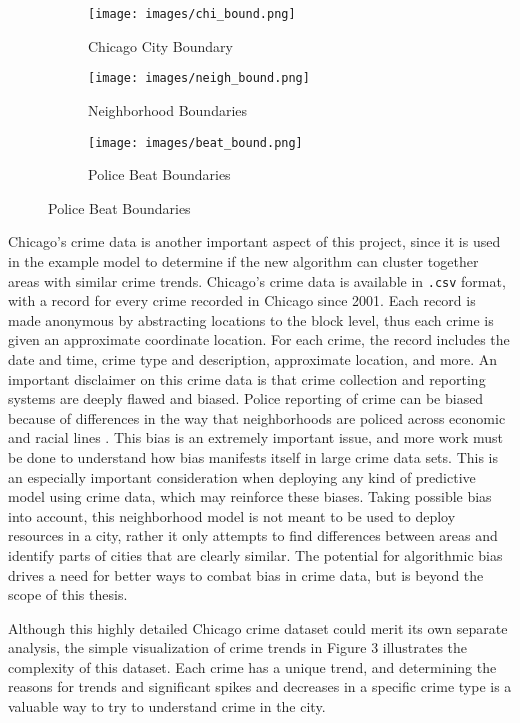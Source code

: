\documentclass[times new roman,12pt]{article}
\begin{document}
\begin{figure}[H]
\centering
\caption{Various Chicago Shapefile Boundaries}
\begin{subfigure}[t]{.33\textwidth}
\centering
  \texttt{[image: images/chi\_bound.png]}
  \caption{Chicago City Boundary}
  \label{fig:city_bound}
\end{subfigure}%
\begin{subfigure}[t]{.33\textwidth}
\centering
  \texttt{[image: images/neigh\_bound.png]}
  \caption{Neighborhood Boundaries}
  \label{fig:neigh_bound}
\end{subfigure}%
\begin{subfigure}[t]{.33\textwidth}
\centering
  \texttt{[image: images/beat\_bound.png]}
  \caption{Police Beat Boundaries}
  \label{fig:beat_bound}
\end{subfigure}
\label{fig:boundaries}
\end{figure}

Chicago's crime data is another important aspect of this project, since it is used in the example model to determine if the new algorithm can cluster together areas with similar crime trends. Chicago's crime data is available in \texttt{.csv} format, with a record for every crime recorded in Chicago since 2001. Each record is made anonymous by abstracting locations to the block level, thus each crime is given an approximate coordinate location. For each crime, the record includes the date and time, crime type and description, approximate location, and more. An important disclaimer on this crime data is that crime collection and reporting systems are deeply flawed and biased. Police reporting of crime can be biased because of differences in the way that neighborhoods are policed across economic and racial lines \cite{gaston_reasonable_2018}. This bias is an extremely important issue, and more work must be done to understand how bias manifests itself in large crime data sets. This is an especially important consideration when deploying any kind of predictive model using crime data, which may reinforce these biases. Taking possible bias into account, this neighborhood model is not meant to be used to deploy resources in a city, rather it only attempts to find differences between areas and identify parts of cities that are clearly similar. The potential for algorithmic bias drives a need for better ways to combat bias in crime data, but is beyond the scope of this thesis.

Although this highly detailed Chicago crime dataset could merit its own separate analysis, the simple visualization of crime trends in Figure 3 illustrates the complexity of this dataset. Each crime has a unique trend, and determining the reasons for trends and significant spikes and decreases in a specific crime type is a valuable way to try to understand crime in the city. 
\end{document}

